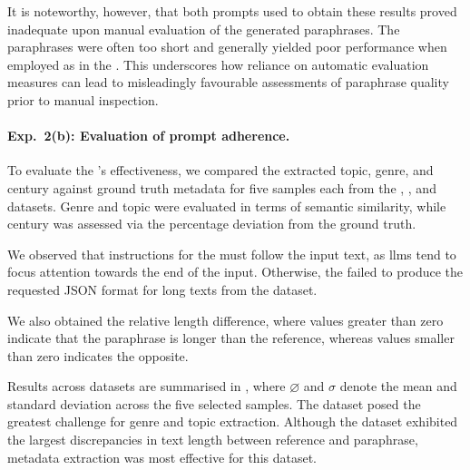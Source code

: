 It is noteworthy, however, that both prompts used to obtain these results proved inadequate upon manual evaluation of the generated paraphrases. 
The paraphrases were often too short and generally yielded poor performance when employed as \imps{} in the \impAppr{}. 
This underscores how reliance on automatic evaluation measures can lead to misleadingly favourable assessments of paraphrase quality prior to manual inspection.


\paragraph{Exp.\ 2(b): Evaluation of prompt adherence.}

To evaluate the \pextractor{}'s effectiveness, we compared the extracted topic, genre, and century against ground truth metadata for five samples each from the \dataBlog{}, \dataGutenberg{}, and \dataStudent{} datasets.
Genre and topic were evaluated in terms of semantic similarity, while century was assessed via the percentage deviation from the ground truth.

We observed that instructions for the \pextractor{} must follow the input text, as \acp{llm} tend to focus attention towards the end of the input. 
Otherwise, the \pextractor{} failed to produce the requested JSON format for long texts from the \dataGutenberg{} dataset. 

We also obtained the relative length difference, where values greater than zero indicate that the paraphrase is longer than the reference, whereas values smaller than zero indicates the opposite.

Results across datasets are summarised in , where $\diameter$ and $\sigma$ denote the mean and standard deviation across the five selected samples. 
The \dataBlog{} dataset posed the greatest challenge for genre and topic extraction. 
Although the \dataGutenberg{} dataset exhibited the largest discrepancies in text length between reference and paraphrase, metadata extraction was most effective for this dataset.


